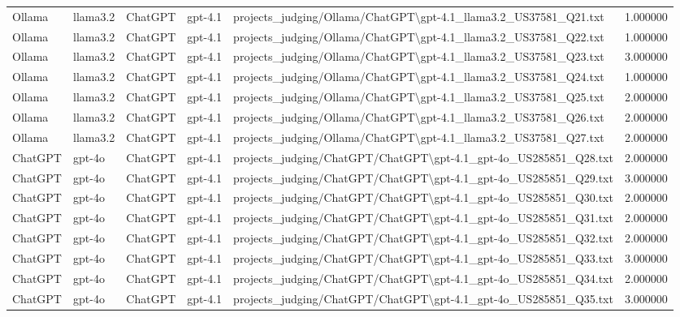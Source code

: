 \begin{table}[H]
\begin{tabular}{lllllr}
Ollama & llama3.2 & ChatGPT & gpt-4.1 & projects\_judging/Ollama/ChatGPT\textbackslash gpt-4.1\_llama3.2\_US37581\_Q21.txt & 1.000000 \\
Ollama & llama3.2 & ChatGPT & gpt-4.1 & projects\_judging/Ollama/ChatGPT\textbackslash gpt-4.1\_llama3.2\_US37581\_Q22.txt & 1.000000 \\
Ollama & llama3.2 & ChatGPT & gpt-4.1 & projects\_judging/Ollama/ChatGPT\textbackslash gpt-4.1\_llama3.2\_US37581\_Q23.txt & 3.000000 \\
Ollama & llama3.2 & ChatGPT & gpt-4.1 & projects\_judging/Ollama/ChatGPT\textbackslash gpt-4.1\_llama3.2\_US37581\_Q24.txt & 1.000000 \\
Ollama & llama3.2 & ChatGPT & gpt-4.1 & projects\_judging/Ollama/ChatGPT\textbackslash gpt-4.1\_llama3.2\_US37581\_Q25.txt & 2.000000 \\
Ollama & llama3.2 & ChatGPT & gpt-4.1 & projects\_judging/Ollama/ChatGPT\textbackslash gpt-4.1\_llama3.2\_US37581\_Q26.txt & 2.000000 \\
Ollama & llama3.2 & ChatGPT & gpt-4.1 & projects\_judging/Ollama/ChatGPT\textbackslash gpt-4.1\_llama3.2\_US37581\_Q27.txt & 2.000000 \\
ChatGPT & gpt-4o & ChatGPT & gpt-4.1 & projects\_judging/ChatGPT/ChatGPT\textbackslash gpt-4.1\_gpt-4o\_US285851\_Q28.txt & 2.000000 \\
ChatGPT & gpt-4o & ChatGPT & gpt-4.1 & projects\_judging/ChatGPT/ChatGPT\textbackslash gpt-4.1\_gpt-4o\_US285851\_Q29.txt & 3.000000 \\
ChatGPT & gpt-4o & ChatGPT & gpt-4.1 & projects\_judging/ChatGPT/ChatGPT\textbackslash gpt-4.1\_gpt-4o\_US285851\_Q30.txt & 2.000000 \\
ChatGPT & gpt-4o & ChatGPT & gpt-4.1 & projects\_judging/ChatGPT/ChatGPT\textbackslash gpt-4.1\_gpt-4o\_US285851\_Q31.txt & 2.000000 \\
ChatGPT & gpt-4o & ChatGPT & gpt-4.1 & projects\_judging/ChatGPT/ChatGPT\textbackslash gpt-4.1\_gpt-4o\_US285851\_Q32.txt & 2.000000 \\
ChatGPT & gpt-4o & ChatGPT & gpt-4.1 & projects\_judging/ChatGPT/ChatGPT\textbackslash gpt-4.1\_gpt-4o\_US285851\_Q33.txt & 3.000000 \\
ChatGPT & gpt-4o & ChatGPT & gpt-4.1 & projects\_judging/ChatGPT/ChatGPT\textbackslash gpt-4.1\_gpt-4o\_US285851\_Q34.txt & 2.000000 \\
ChatGPT & gpt-4o & ChatGPT & gpt-4.1 & projects\_judging/ChatGPT/ChatGPT\textbackslash gpt-4.1\_gpt-4o\_US285851\_Q35.txt & 3.000000 \\

\end{tabular}
\end{table}
